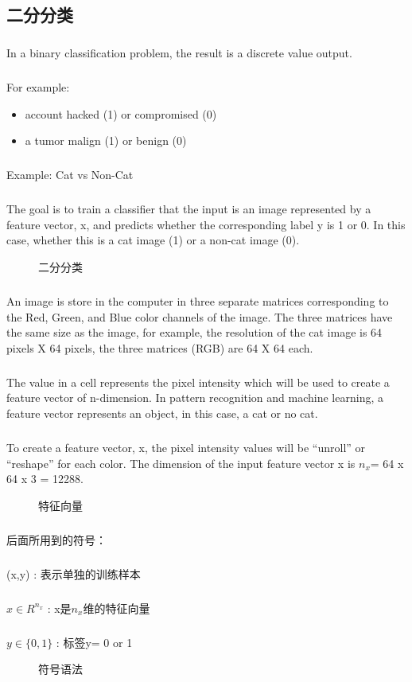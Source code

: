\documentclass{article}
\begin{document}
\begin{CJK}{UTF8}{gbsn}
\subsection{二分分类}
\subparagraph{}
In a binary classification problem, the result is a discrete value output.
\subparagraph{}
For example:
\begin{itemize}
\item account hacked (1) or compromised (0)
\item a tumor malign (1) or benign (0)
\end{itemize}
\subparagraph{}
Example: Cat vs Non-Cat
\subparagraph{}
The goal is to train a classifier that the input is an image represented by a feature vector, x, and predicts
whether the corresponding label y is 1 or 0. In this case, whether this is a cat image (1) or a non-cat image
(0).
\begin{figure}[H]
\caption{二分分类}
\label{fig:1111}
\end{figure}
\subparagraph{}
An image is store in the computer in three separate matrices corresponding to the Red, Green, and Blue color channels of the image. The three matrices have the same size as the image, for example, the resolution of the cat image is 64 pixels X 64 pixels, the three matrices (RGB) are 64 X 64 each.
\subparagraph{}
The value in a cell represents the pixel intensity which will be used to create a feature vector of n-dimension. In pattern recognition and machine learning, a feature vector represents an object, in this case, a cat or no cat.
\subparagraph{}
To create a feature vector, x, the pixel intensity values will be “unroll” or “reshape” for each color. The
dimension of the input feature vector x is $n_x$= 64 x 64 x 3 = 12288.
\begin{figure}[H]
\caption{特征向量}
\label{fig:1112}
\end{figure}
\subparagraph{}
后面所用到的符号：
\subparagraph{}
(x,y) : 表示单独的训练样本
\subparagraph{}
$x\in{R^{n_x}}$ : x是$n_x$维的特征向量
\subparagraph{}
$y\in{\{{}0,1\}{}}$ : 标签y= 0 or 1
\begin{figure}[H]
\caption{符号语法}
\label{fig:1113}
\end{figure}

\end{CJK}
\end{document}
